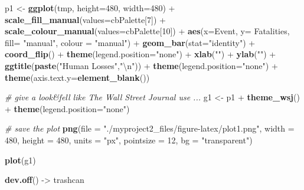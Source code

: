 \documentclass[12pt,spanish, american,b4paper, onecolumn, lmargin=1cm, rmargin=1cm, tmargin=1cm, bmargin=2cm,]{article}
\newenvironment{Shaded}{}{}
\newcommand{\KeywordTok}[1]{\textbf{{#1}}}
\newcommand{\DataTypeTok}[1]{\textcolor[rgb]{0.50,0.00,0.00}{{#1}}}
\newcommand{\DecValTok}[1]{\textcolor[rgb]{0.00,0.00,1.00}{{#1}}}
\newcommand{\CharTok}[1]{\textcolor[rgb]{1.00,0.00,1.00}{{#1}}}
\newcommand{\StringTok}[1]{\textcolor[rgb]{0.87,0.00,0.00}{{#1}}}
\newcommand{\CommentTok}[1]{\textcolor[rgb]{0.50,0.50,0.50}{\textit{{#1}}}}
\newcommand{\NormalTok}[1]{{#1}}
\begin{document}
\begin{Shaded}
\begin{Highlighting}[]
\NormalTok{p1 <-}\StringTok{ }\KeywordTok{ggplot}\NormalTok{(tmp, }\DataTypeTok{height=}\DecValTok{480}\NormalTok{, }\DataTypeTok{width=}\DecValTok{480}\NormalTok{) +}\StringTok{ }
\StringTok{  }\KeywordTok{scale_fill_manual}\NormalTok{(}\DataTypeTok{values=}\NormalTok{cbPalette[}\DecValTok{7}\NormalTok{]) +}
\StringTok{  }\KeywordTok{scale_colour_manual}\NormalTok{(}\DataTypeTok{values=}\NormalTok{cbPalette[}\DecValTok{10}\NormalTok{]) +}
\StringTok{  }\KeywordTok{aes}\NormalTok{(}\DataTypeTok{x=}\NormalTok{Event, }\DataTypeTok{y=} \NormalTok{Fatalities, }\DataTypeTok{fill=} \StringTok{"manual"}\NormalTok{, }\DataTypeTok{colour =} \StringTok{"manual"}\NormalTok{) +}
\StringTok{  }\KeywordTok{geom_bar}\NormalTok{(}\DataTypeTok{stat=}\StringTok{"identity"}\NormalTok{) +}
\StringTok{  }\KeywordTok{coord_flip}\NormalTok{() +}\StringTok{ }
\StringTok{  }\KeywordTok{theme}\NormalTok{(}\DataTypeTok{legend.position=}\StringTok{"none"}\NormalTok{) +}\StringTok{ }
\StringTok{  }\KeywordTok{xlab}\NormalTok{(}\StringTok{""}\NormalTok{) +}\StringTok{ }
\StringTok{  }\KeywordTok{ylab}\NormalTok{(}\StringTok{""}\NormalTok{) +}\StringTok{ }
\StringTok{  }\KeywordTok{ggtitle}\NormalTok{(}\KeywordTok{paste}\NormalTok{(}\StringTok{"Human Losses"}\NormalTok{,}\StringTok{"}\CharTok{\textbackslash{}n}\StringTok{"}\NormalTok{)) +}
\StringTok{  }\KeywordTok{theme}\NormalTok{(}\DataTypeTok{legend.position=}\StringTok{"none"}\NormalTok{) +}
\StringTok{  }\KeywordTok{theme}\NormalTok{(}\DataTypeTok{axis.text.y=}\KeywordTok{element_blank}\NormalTok{())}

\CommentTok{# give a look&fell like The Wall Street Journal use ... }
\NormalTok{g1 <-}\StringTok{ }\NormalTok{p1 +}\StringTok{ }
\StringTok{  }\KeywordTok{theme_wsj}\NormalTok{() +}
\StringTok{  }\KeywordTok{theme}\NormalTok{(}\DataTypeTok{legend.position=}\StringTok{"none"}\NormalTok{)}

\CommentTok{# save the plot }
\KeywordTok{png}\NormalTok{(}\DataTypeTok{file =} \StringTok{"./myproject2_files/figure-latex/plot1.png"}\NormalTok{, }
    \DataTypeTok{width =} \DecValTok{480}\NormalTok{, }
    \DataTypeTok{height =} \DecValTok{480}\NormalTok{, }
    \DataTypeTok{units =} \StringTok{"px"}\NormalTok{, }
    \DataTypeTok{pointsize =} \DecValTok{12}\NormalTok{,}
    \DataTypeTok{bg =} \StringTok{"transparent"}\NormalTok{)}

\KeywordTok{plot}\NormalTok{(g1)}

\KeywordTok{dev.off}\NormalTok{() ->}\StringTok{ }\NormalTok{trashcan}
\end{Highlighting}
\end{Shaded}
\end{document}

